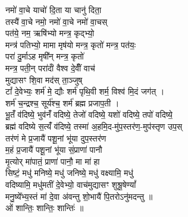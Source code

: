 नमो॑ वा॒चे याचो॑ दि॒ता या चानु॑ दिता॒\\
तस्यै॑ वा॒चे नमो॒ नमो॑ वा॒चे नमो॑ वा॒चस् \\
पत॑ये॒ नम॒ ऋषि॑भ्यो मन्त्र॒ कृद्भ्यो॒\\
मन्त्र॑ पतिभ्यो॒ मामा मृष॑यो मन्त्र॒ कृतो॑ मन्त्र॒ पत॑यः॒\\
परा॑ दु॒र्माऽह मृषी᳚न् मन्त्र॒ कृतो॑\\
मन्त्र॒ पती॒न् परा॑दांँ वैश्व दे॒वींँ वाच॑  \\
मुद्यासꣳ शि॒वा मद॑स् ता॒ञ्जुष् \\
टां᳚ दे॒वेभ्यः॒ शर्म॑ मे॒ द्यौः शर्म॑ पृथि॒वी शर्म॒ विश्व॑ मि॒दं जग॑त् ।\\
शर्म॑ च॒न्द्रश्च॒ सूर्य॑श्च॒ शर्म॑ ब्रह्म प्रजाप॒ती ।\\
भू॒तंँ व॑दिष्ये॒ भुव॑नंँ वदिष्ये॒ तेजो॑ वदिष्ये॒ यशो॑ वदिष्ये॒ तपो॑ वदिष्ये॒\\
ब्रह्म॑ वदिष्ये स॒त्यंँ व॑दिष्ये॒ तस्मा॑ अ॒हमि॒द-मु॑प॒स्तर॑ण॒-मुप॑स्तृण उप॒स् \\
तर॑णं मे प्र॒जायै॑ पशू॒नां भू॑या दुप॒स्तर॑ण \\
म॒हं प्र॒जायै॑ पशू॒नां भू॑या सं॒प्राणा॑ पानौ \\
मृ॒त्योर् मा॑पातं॒ प्राणा॑ पानौ॒ मा मा॑ हा \\
सिष्टं॒ मधु॑ मनिष्ये॒ मधु॑ जनिष्ये॒ मधु॑ वक्ष्यामि॒ मधु॑ \\
वदिष्यामि॒ मधु॑मतीं दे॒वेभ्यो॒ वाच॑मुद्यासꣳ शुश्रू॒षेण्यां᳚ \\
मनु॒ष्ये᳚भ्य॒स्तं मा॑ दे॒वा अ॑वन्तु शो॒भायै॑ पि॒तरोऽनु॑मदन्तु ॥ \\
ओं शान्तिः॒ शान्तिः॒ शान्तिः॑ ॥\\